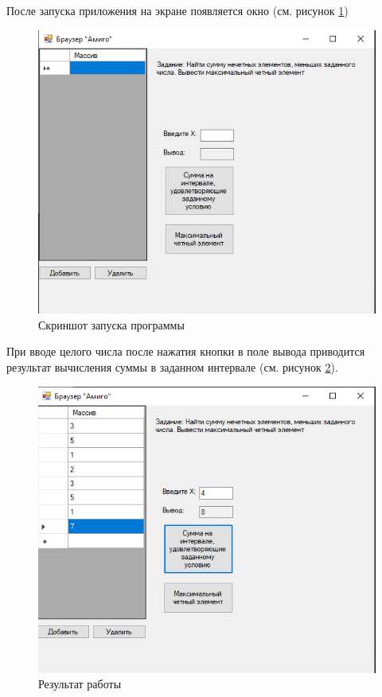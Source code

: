 После запуска приложения на экране появляется окно (см. рисунок \ref{fig:exec4})
\begin{figure}[H]
    \centering
    \includegraphics{task4/exec.png}
    \caption{Скриншот запуска программы}
    \label{fig:exec4}
\end{figure}
При вводе целого числа после нажатия кнопки в поле вывода приводится
результат вычисления суммы в заданном интервале (см. рисунок \ref{fig:result41}).
\begin{figure}[H]
    \centering
    \includegraphics{task4/result1.png}
    \caption{Результат работы}
    \label{fig:result41}
\end{figure}
